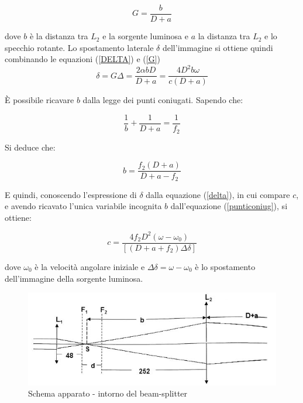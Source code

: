 \documentclass{article}
\begin{document}
\begin{equation}
G=\frac{b}{D+a}
\label{G}
\end{equation}

dove $b$ è la distanza tra $L_2$ e la sorgente luminosa e $a$  la distanza tra $L_2$ e lo specchio rotante. Lo spostamento laterale $\delta$ dell'immagine si ottiene quindi
combinando le equazioni (\ref{DELTA}) e (\ref{G})
\begin{equation}
\delta = G\Delta =\frac{2\alpha b D}{D + a}=\frac{4 D^2 b \omega}{c(D+a)}
\label{delta}
\end{equation}

È possibile ricavare $b$ dalla legge dei punti coniugati. Sapendo che:

\begin{equation}
\frac{1}{b}+\frac{1}{D+a}=\frac{1}{f_2}
\label{punticoniug}
\end{equation}

Si deduce che:

\begin{equation}
b=\frac{f_2(D+a)}{D+a-f_2}
\end{equation}

E quindi, conoscendo l'espressione di $\delta$ dalla equazione (\ref{delta}), in cui compare $c$, e avendo ricavato l'unica variabile incognita $b$ dall'equazione
(\ref{punticoniug}), si ottiene:

\begin{equation}
c = \frac{4f_2D^2(\omega-\omega_0)}{[(D+a+f_2)\Delta\delta]}
\label{c_equation}
\end{equation}

dove $\omega_0$ è la velocità angolare iniziale e $\Delta\delta = \omega - \omega_0$ è lo spostamento dell'immagine della sorgente luminosa.

\begin{figure}[h]
    \centering
        \includegraphics[width=0.6\linewidth]{IntroTeorica1.JPG}
    \caption{Schema apparato - intorno del beam-splitter}
\end{figure}


\newpage
\end{document}
